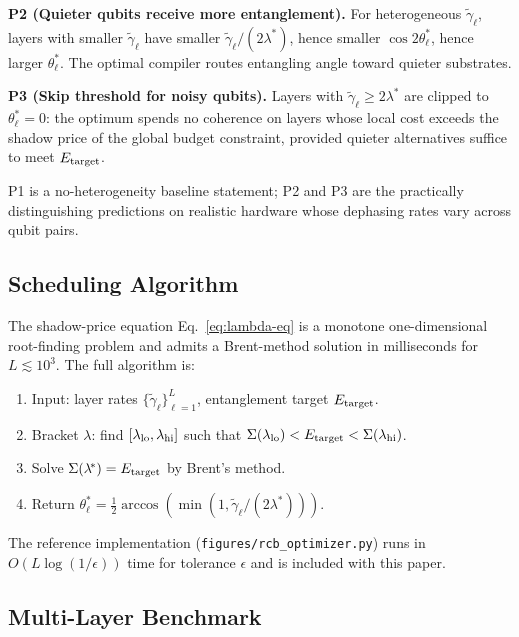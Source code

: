 \textbf{P2 (Quieter qubits receive more entanglement).}
For heterogeneous $\tilde\gamma_\ell$, layers with smaller
$\tilde\gamma_\ell$ have smaller $\tilde\gamma_\ell/(2\lambda^{\!*})$,
hence smaller $\cos 2\theta_\ell^*$, hence larger $\theta_\ell^*$.
The optimal compiler routes entangling angle toward quieter substrates.

\textbf{P3 (Skip threshold for noisy qubits).}
Layers with $\tilde\gamma_\ell \geq 2\lambda^{\!*}$ are clipped to
$\theta_\ell^* = 0$: the optimum spends no coherence on layers whose
local cost exceeds the shadow price of the global budget constraint,
provided quieter alternatives suffice to meet $E_{\rm target}$.

P1 is a no-heterogeneity baseline statement;
P2 and P3 are the practically distinguishing predictions on
realistic hardware whose dephasing rates vary across qubit pairs.

\subsection{Scheduling Algorithm}
\label{subsec:algorithm}

The shadow-price equation Eq.~\eqref{eq:lambda-eq} is a monotone
one-dimensional root-finding problem and admits a Brent-method
solution in milliseconds for $L \lesssim 10^3$.
The full algorithm is:

\begin{enumerate}
  \item Input: layer rates $\{\tilde\gamma_\ell\}_{\ell=1}^L$,
        entanglement target $E_{\rm target}$.
  \item Bracket $\lambda$: find $[\lambda_{\rm lo}, \lambda_{\rm hi}]$
        such that $\Sigma(\lambda_{\rm lo}) < E_{\rm target} < \Sigma(\lambda_{\rm hi})$.
  \item Solve $\Sigma(\lambda^{\!*}) = E_{\rm target}$ by Brent's method.
  \item Return $\theta_\ell^* = \tfrac{1}{2}\arccos(\min(1,\tilde\gamma_\ell/(2\lambda^{\!*})))$.
\end{enumerate}

The reference implementation (\texttt{figures/\allowbreak rcb\_\allowbreak optimizer.py})
runs in $O(L \log(1/\epsilon))$ time for tolerance $\epsilon$ and is
included with this paper.

\subsection{Multi-Layer Benchmark}
\label{subsec:benchmark-alloc}

